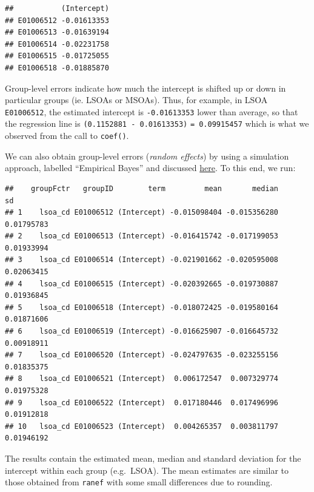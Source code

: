 \documentclass[]{book}
\newenvironment{Shaded}{\begin{snugshade}}{\end{snugshade}}
\newcommand{\KeywordTok}[1]{\textcolor[rgb]{0.13,0.29,0.53}{\textbf{#1}}}
\newcommand{\DecValTok}[1]{\textcolor[rgb]{0.00,0.00,0.81}{#1}}
\newcommand{\StringTok}[1]{\textcolor[rgb]{0.31,0.60,0.02}{#1}}
\newcommand{\CommentTok}[1]{\textcolor[rgb]{0.56,0.35,0.01}{\textit{#1}}}
\newcommand{\OperatorTok}[1]{\textcolor[rgb]{0.81,0.36,0.00}{\textbf{#1}}}
\newcommand{\NormalTok}[1]{#1}
\begin{document}
\begin{verbatim}
##           (Intercept)
## E01006512 -0.01613353
## E01006513 -0.01639194
## E01006514 -0.02231758
## E01006515 -0.01725055
## E01006518 -0.01885870
\end{verbatim}

Group-level errors indicate how much the intercept is shifted up or down
in particular groups (ie. LSOAs or MSOAs). Thus, for example, in LSOA
\texttt{E01006512}, the estimated intercept is \texttt{-0.01613353}
lower than average, so that the regression line is
\texttt{(0.1152881\ -\ 0.01613353)} \texttt{=\ 0.09915457} which is what
we observed from the call to \texttt{coef()}.

We can also obtain group-level errors (\emph{random effects}) by using a
simulation approach, labelled ``Empirical Bayes'' and discussed
\href{https://stat.ethz.ch/pipermail/r-sig-mixed-models/2009q4/002984.html}{here}.
To this end, we run:

\begin{Shaded}
\end{Shaded}

\begin{verbatim}
##    groupFctr   groupID        term         mean       median         sd
## 1    lsoa_cd E01006512 (Intercept) -0.015098404 -0.015356280 0.01795783
## 2    lsoa_cd E01006513 (Intercept) -0.016415742 -0.017199053 0.01933994
## 3    lsoa_cd E01006514 (Intercept) -0.021901662 -0.020595008 0.02063415
## 4    lsoa_cd E01006515 (Intercept) -0.020392665 -0.019730887 0.01936845
## 5    lsoa_cd E01006518 (Intercept) -0.018072425 -0.019580164 0.01871606
## 6    lsoa_cd E01006519 (Intercept) -0.016625907 -0.016645732 0.00918911
## 7    lsoa_cd E01006520 (Intercept) -0.024797635 -0.023255156 0.01835375
## 8    lsoa_cd E01006521 (Intercept)  0.006172547  0.007329774 0.01975328
## 9    lsoa_cd E01006522 (Intercept)  0.017180446  0.017496996 0.01912818
## 10   lsoa_cd E01006523 (Intercept)  0.004265357  0.003811797 0.01946192
\end{verbatim}

The results contain the estimated mean, median and standard deviation
for the intercept within each group (e.g.~LSOA). The mean estimates are
similar to those obtained from \texttt{ranef} with some small
differences due to rounding.
\end{document}
